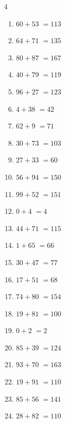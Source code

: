 \begin{multicols}{4}
\begin{enumerate}
  \item $60+53$
        $=113$

  \item $64+71$
        $=135$

  \item $80+87$
        $=167$

  \item $40+79$
        $=119$

  \item $96+27$
        $=123$

  \item $4+38$
        $=42$

  \item $62+9$
        $=71$

  \item $30+73$
        $=103$

  \item $27+33$
        $=60$

  \item $56+94$
        $=150$

  \item $99+52$
        $=151$

  \item $0+4$
        $=4$

  \item $44+71$
        $=115$

  \item $1+65$
        $=66$

  \item $30+47$
        $=77$

  \item $17+51$
        $=68$

  \item $74+80$
        $=154$

  \item $19+81$
        $=100$

  \item $0+2$
        $=2$

  \item $85+39$
        $=124$

  \item $93+70$
        $=163$

  \item $19+91$
        $=110$

  \item $85+56$
        $=141$

  \item $28+82$
        $=110$


\end{enumerate}
\end{multicols}
